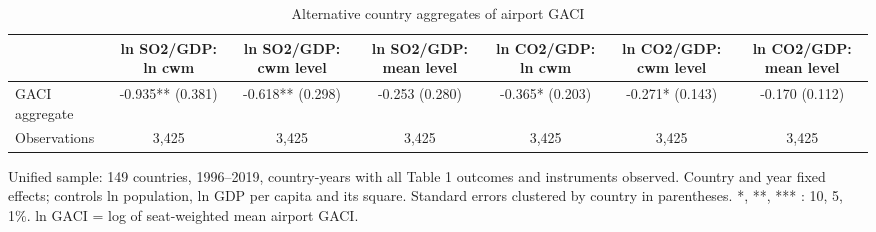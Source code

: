 \begin{table}[htbp]\centering\small
\caption{Alternative country aggregates of airport GACI}\label{tab:A2}
\begin{tabular}{lcccccc}
\toprule
 & ln SO2/GDP: ln cwm & ln SO2/GDP: cwm level & ln SO2/GDP: mean level & ln CO2/GDP: ln cwm & ln CO2/GDP: cwm level & ln CO2/GDP: mean level \\
\midrule
GACI aggregate & -0.935** (0.381) & -0.618** (0.298) & -0.253 (0.280) & -0.365* (0.203) & -0.271* (0.143) & -0.170 (0.112) \\
Observations & 3,425 & 3,425 & 3,425 & 3,425 & 3,425 & 3,425 \\
\bottomrule
\end{tabular}
\begin{minipage}{0.95\textwidth}\footnotesize Unified sample: 149 countries, 1996--2019, country-years with all Table 1 outcomes and instruments observed. Country and year fixed effects; controls ln population, ln GDP per capita and its square. Standard errors clustered by country in parentheses. *, **, *** : 10, 5, 1\%. ln GACI = log of seat-weighted mean airport GACI.\end{minipage}
\end{table}